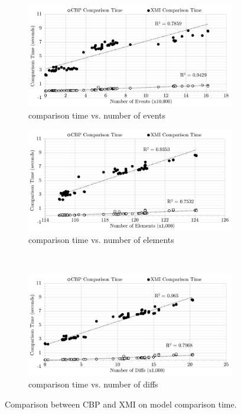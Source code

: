 \documentclass{llncs}
\begin{document}
\begin{figure}
\hfill
\centering    
\begin{subfigure}[t]{\linewidth}
    \centering
    \includegraphics[width=\linewidth]{images/Time-Events}
    \caption{comparison time vs. number of events}
    \label{fig:time_events}
\end{subfigure}
\hfill
\centering    
\begin{subfigure}[t]{\linewidth}
    \centering
    \includegraphics[width=\linewidth]{images/Time-Elements}
    \caption{comparison time vs. number of elements}
    \label{fig:time_elements}
\end{subfigure}
\\
\hfill
\centering    
\begin{subfigure}[t]{\linewidth}
    \centering
    \includegraphics[width=\linewidth]{images/Time-Diffs}
    \caption{comparison time vs. number of diffs}
    \label{fig:time_diffs}
\end{subfigure}
\hfill
\label{fig:perfomance_evaluation}
\caption{Comparison between CBP and XMI on model comparison time.}
\end{figure}
\end{document}
